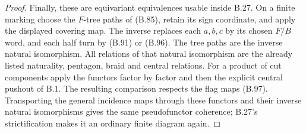 \begin{proof}
Finally, these are equivariant equivalences usable inside
B.27.  On a finite marking choose the $F$-tree paths of
(B.85), retain its sign coordinate, and apply the displayed
covering map.  The inverse replaces each $a,b,c$ by its
chosen $F/B$ word, and each half turn by (B.91) or (B.96).
The tree paths are the inverse natural isomorphism.  All
relations of that natural isomorphism are the already
listed naturality, pentagon, braid and central relations.
For a product of cut components apply the functors factor
by factor and then the explicit central pushout of B.1.
The resulting comparison respects the flag maps (B.97).
Transporting the general incidence maps through these
functors and their inverse natural isomorphisms gives the
same pseudofunctor coherence; B.27's strictification makes
it an ordinary finite diagram again.
\end{proof}
